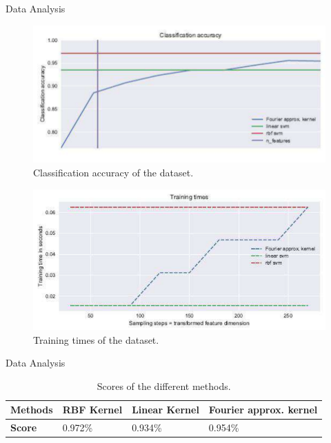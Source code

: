 \documentclass[unknownkeysallowed]{beamer}
\begin{document}
\begin{frame}{Data Analysis}

\begin{figure}[h!]
    \centering
    \includegraphics[scale=0.45]{images/Classification_accuracy.pdf}
    \caption{Classification accuracy of the dataset.}
    \label{accuracy_time}
\end{figure}

\begin{figure}[h!]
    \centering
    \includegraphics[scale=0.45]{images/Training_times.pdf}
    \caption{Training times of the dataset.}
    \label{accuracy_time}
\end{figure}

\end{frame}

\begin{frame}{Data Analysis}

\begin{table}[h!]
   \centering
    \begin{tabular}{|p{1.5cm}||p{2cm}|p{2cm}|p{3cm}|}
    \hline
    \textbf{Methods} & RBF Kernel & Linear Kernel & Fourier approx. kernel \\
    \hline
     \textbf{Score} & 0.972\% & 0.934\% & 0.954\%\\ 
     \hline
    \end{tabular}
    \caption{Scores of the different methods.}
    \label{Table score}
\end{table}

\end{frame}
\end{document}
